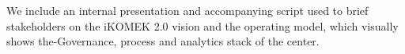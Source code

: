 We include an internal presentation and accompanying script used to brief stakeholders on the iKOMEK 2.0 vision and the operating model, which visually shows the-Governance, process and analytics stack of the center. 

